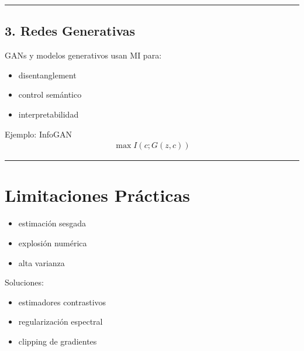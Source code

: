 \documentclass[letterpaper,10pt,english]{jupyterBook}
\begin{document}
\bigskip\hrule\bigskip



\subsection{3. Redes Generativas}
\label{\detokenize{04_data_science_applications/deep_learning_mi:redes-generativas}}
\sphinxAtStartPar
GANs y modelos generativos usan MI para:
\begin{itemize}
\item {} 
\sphinxAtStartPar
disentanglement

\item {} 
\sphinxAtStartPar
control semántico

\item {} 
\sphinxAtStartPar
interpretabilidad

\end{itemize}

\sphinxAtStartPar
Ejemplo: InfoGAN
\begin{equation*}
\begin{split}
\max I(c;G(z,c))
\end{split}
\end{equation*}

\bigskip\hrule\bigskip



\section{Limitaciones Prácticas}
\label{\detokenize{04_data_science_applications/deep_learning_mi:limitaciones-practicas}}\begin{itemize}
\item {} 
\sphinxAtStartPar
estimación sesgada

\item {} 
\sphinxAtStartPar
explosión numérica

\item {} 
\sphinxAtStartPar
alta varianza

\end{itemize}

\sphinxAtStartPar
Soluciones:
\begin{itemize}
\item {} 
\sphinxAtStartPar
estimadores contrastivos

\item {} 
\sphinxAtStartPar
regularización espectral

\item {} 
\sphinxAtStartPar
clipping de gradientes

\end{itemize}
\end{document}
